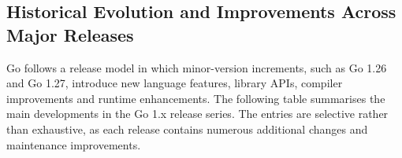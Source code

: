 \subsection{Historical Evolution and Improvements Across Major Releases}

Go follows a release model in which minor-version increments, such as Go 1.26 and Go 1.27, introduce new language features, library APIs, compiler improvements and runtime enhancements. The following table summarises the main developments in the Go 1.x release series. The entries are selective rather than exhaustive, as each release contains numerous additional changes and maintenance improvements.


